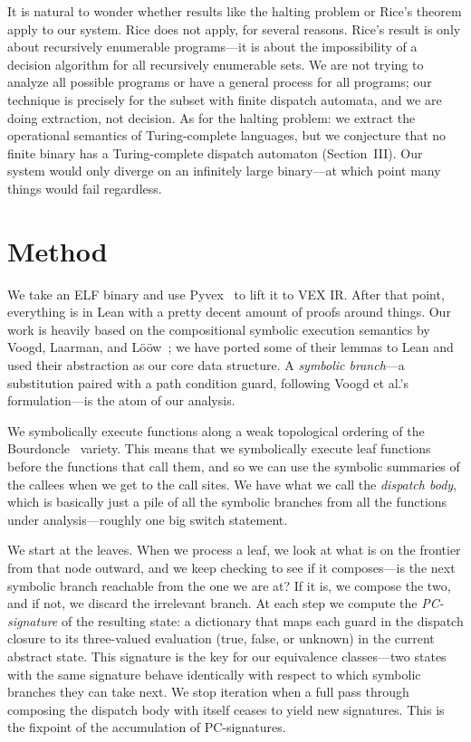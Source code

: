 \documentclass[conference]{./template/IEEEtran}
\begin{document}
It is natural to wonder whether results like the halting problem or Rice's theorem apply to our system. Rice does not apply, for several reasons. Rice's result is only about recursively enumerable programs---it is about the impossibility of a decision algorithm for all recursively enumerable sets. We are not trying to analyze all possible programs or have a general process for all programs; our technique is precisely for the subset with finite dispatch automata, and we are doing extraction, not decision. As for the halting problem: we extract the operational semantics of Turing-complete languages, but we conjecture that no finite binary has a Turing-complete dispatch automaton (Section~III). Our system would only diverge on an infinitely large binary---at which point many things would fail regardless.

\section{Method}

We take an ELF binary and use Pyvex~\cite{shoshitaishvili2016sok} to lift it to VEX IR. After that point, everything is in Lean with a pretty decent amount of proofs around things. Our work is heavily based on the compositional symbolic execution semantics by Voogd, Laarman, and L\"{o}\"{o}w~\cite{voogd2025compositional}; we have ported some of their lemmas to Lean and used their abstraction as our core data structure. A \emph{symbolic branch}---a substitution paired with a path condition guard, following Voogd et al.'s formulation---is the atom of our analysis.

We symbolically execute functions along a weak topological ordering of the Bourdoncle~\cite{bourdoncle1993efficient} variety. This means that we symbolically execute leaf functions before the functions that call them, and so we can use the symbolic summaries of the callees when we get to the call sites. We have what we call the \emph{dispatch body}, which is basically just a pile of all the symbolic branches from all the functions under analysis---roughly one big switch statement.

We start at the leaves. When we process a leaf, we look at what is on the frontier from that node outward, and we keep checking to see if it composes---is the next symbolic branch reachable from the one we are at? If it is, we compose the two, and if not, we discard the irrelevant branch. At each step we compute the \emph{PC-signature} of the resulting state: a dictionary that maps each guard in the dispatch closure to its three-valued evaluation (true, false, or unknown) in the current abstract state. This signature is the key for our equivalence classes---two states with the same signature behave identically with respect to which symbolic branches they can take next. We stop iteration when a full pass through composing the dispatch body with itself ceases to yield new signatures. This is the fixpoint of the accumulation of PC-signatures.
\end{document}
